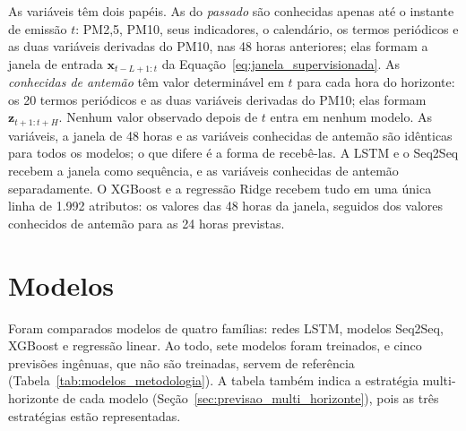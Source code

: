 As variáveis têm dois papéis. As do \emph{passado} são conhecidas apenas até o instante de emissão \(t\): PM2,5, PM10, seus indicadores, o calendário, os termos periódicos e as duas variáveis derivadas do PM10, nas 48 horas anteriores; elas formam a janela de entrada \(\mathbf{x}_{t-L+1:t}\) da Equação~\ref{eq:janela_supervisionada}. As \emph{conhecidas de antemão} têm valor determinável em \(t\) para cada hora do horizonte: os 20 termos periódicos e as duas variáveis derivadas do PM10; elas formam \(\mathbf{z}_{t+1:t+H}\). Nenhum valor observado depois de \(t\) entra em nenhum modelo. As variáveis, a janela de 48 horas e as variáveis conhecidas de antemão são idênticas para todos os modelos; o que difere é a forma de recebê-las. A LSTM e o Seq2Seq recebem a janela como sequência, e as variáveis conhecidas de antemão separadamente. O XGBoost e a regressão Ridge recebem tudo em uma única linha de 1.992 atributos: os valores das 48 horas da janela, seguidos dos valores conhecidos de antemão para as 24 horas previstas.

\section{Modelos}
\label{sec:modelos}

Foram comparados modelos de quatro famílias: redes LSTM, modelos Seq2Seq, XGBoost e regressão linear. Ao todo, sete modelos foram treinados, e cinco previsões ingênuas, que não são treinadas, servem de referência (Tabela~\ref{tab:modelos_metodologia}). A tabela também indica a estratégia multi-horizonte de cada modelo (Seção~\ref{sec:previsao_multi_horizonte}), pois as três estratégias estão representadas.


